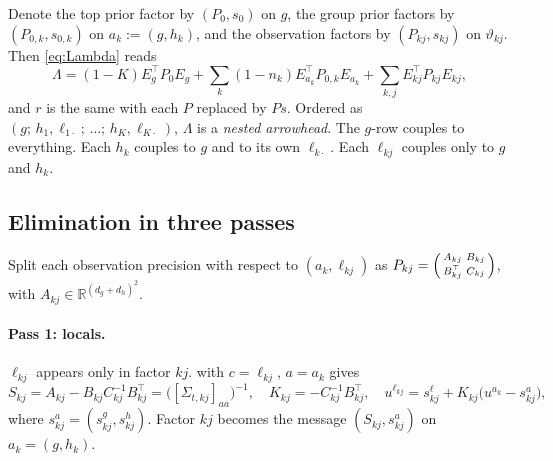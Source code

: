\documentclass[11pt]{article}
\theoremstyle{definition}
\theoremstyle{remark}
\newcommand{\R}{\mathbb{R}}
\newcommand{\T}{\top}
\begin{document}
Denote the top prior factor by $(P_0,s_0)$ on $g$, the group prior factors by
$(P_{0,k},s_{0,k})$ on $a_k:=(g,h_k)$, and the observation factors by
$(P_{kj},s_{kj})$ on $\vartheta_{kj}$. Then \eqref{eq:Lambda} reads
\[
\Lambda=(1-K)E_g^\T P_0E_g+\sum_k(1-n_k)E_{a_k}^\T P_{0,k}E_{a_k}+\sum_{k,j}E_{kj}^\T P_{kj}E_{kj},
\]
and $r$ is the same with each $P$ replaced by $Ps$. Ordered as
$(g;\,h_1,\ell_{1\cdot};\,\dots;\,h_K,\ell_{K\cdot})$, $\Lambda$ is a
\emph{nested arrowhead}. The $g$-row couples to everything. Each $h_k$ couples
to $g$ and to its own $\ell_{k\cdot}$. Each $\ell_{kj}$ couples only to $g$ and
$h_k$.

\subsection{Elimination in three passes}

Split each observation precision with respect to $(a_k,\ell_{kj})$ as
$P_{kj}=\begin{psmallmatrix}A_{kj}&B_{kj}\\B_{kj}^\T&C_{kj}\end{psmallmatrix}$, with
$A_{kj}\in\R^{(d_g+d_h)^2}$.

\paragraph{Pass 1: locals.} $\ell_{kj}$ appears only in factor $kj$.
 with $c=\ell_{kj}$, $a=a_k$ gives
\begin{equation}\label{eq:pass1}
S_{kj}=A_{kj}-B_{kj}C_{kj}^{-1}B_{kj}^\T=\big([\Sigma_{t,kj}]_{a a}\big)^{-1},\quad
K_{kj}=-C_{kj}^{-1}B_{kj}^\T,\quad
u^{\ell_{kj}}=s^\ell_{kj}+K_{kj}\big(u^{a_k}-s^{a}_{kj}\big),
\end{equation}
where $s^a_{kj}=(s^g_{kj},s^h_{kj})$. Factor $kj$ becomes the message
$(S_{kj},s^a_{kj})$ on $a_k=(g,h_k)$.
\end{document}
